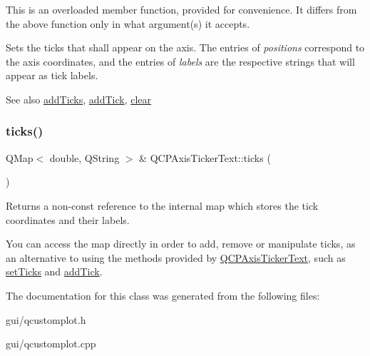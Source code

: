 This is an overloaded member function, provided for convenience. It differs from the above function only in what argument(s) it accepts.

Sets the ticks that shall appear on the axis. The entries of {\itshape positions} correspond to the axis coordinates, and the entries of {\itshape labels} are the respective strings that will appear as tick labels.

\begin{DoxySeeAlso}{See also}
\hyperlink{classQCPAxisTickerText_aba34051300eecaefbedb2df8feff2d45}{add\+Ticks}, \hyperlink{classQCPAxisTickerText_a3362873a48614e6d446c193548cb85e3}{add\+Tick}, \hyperlink{classQCPAxisTickerText_a21826d2fcd9a25c194d34d4f67aa1460}{clear} 
\end{DoxySeeAlso}
\mbox{\label{classQCPAxisTickerText_ac84622a6bb4f2a98474e185ecaf3189a}} 
\subsubsection{\texorpdfstring{ticks()}{ticks()}}
{\footnotesize\ttfamily Q\+Map$<$ double, Q\+String $>$ \& Q\+C\+P\+Axis\+Ticker\+Text\+::ticks (\begin{DoxyParamCaption}{ }\end{DoxyParamCaption})\hspace{0.3cm}{\ttfamily [inline]}}

Returns a non-\/const reference to the internal map which stores the tick coordinates and their labels.

You can access the map directly in order to add, remove or manipulate ticks, as an alternative to using the methods provided by \hyperlink{classQCPAxisTickerText}{Q\+C\+P\+Axis\+Ticker\+Text}, such as \hyperlink{classQCPAxisTickerText_a8cdf1f21940f1f53f5e3d30b2c74f5cf}{set\+Ticks} and \hyperlink{classQCPAxisTickerText_a3362873a48614e6d446c193548cb85e3}{add\+Tick}. 

The documentation for this class was generated from the following files\+:\begin{DoxyCompactItemize}
\item 
gui/qcustomplot.\+h\item 
gui/qcustomplot.\+cpp\end{DoxyCompactItemize}
